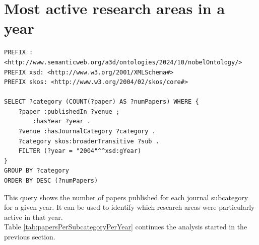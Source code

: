 \documentclass{article}
\begin{document}
\section{Most active research areas in a year} \label{moreActiveResearchAreas}
\begin{lstlisting}
PREFIX : <http://www.semanticweb.org/a3d/ontologies/2024/10/nobelOntology/>
PREFIX xsd: <http://www.w3.org/2001/XMLSchema#>
PREFIX skos: <http://www.w3.org/2004/02/skos/core#>

SELECT ?category (COUNT(?paper) AS ?numPapers) WHERE {
    ?paper :publishedIn ?venue ;
        :hasYear ?year .
    ?venue :hasJournalCategory ?category .
    ?category skos:broaderTransitive ?sub .
    FILTER (?year = "2004"^^xsd:gYear)
}
GROUP BY ?category
ORDER BY DESC (?numPapers)
\end{lstlisting}

This query shows the number of papers published for each journal subcategory for a given year.
It can be used to identify which research areas were particularly active in that year.\\
Table \ref{tab:papersPerSubcategoryPerYear} continues the analysis started in the previous section.
\end{document}
